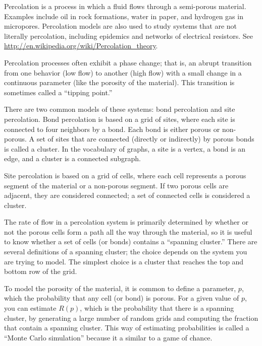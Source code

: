 \documentclass[10pt]{book}
\begin{document}
Percolation is a process in which a fluid flows through a semi-porous
material.  Examples include oil in rock formations, water in paper,
and hydrogen gas in micropores.  Percolation models are also used to
study systems that are not literally percolation, including epidemics
and networks of electrical resistors.  See
\url{http://en.wikipedia.org/wiki/Percolation_theory}.

Percolation processes often exhibit a phase change; that is, an
abrupt transition from one behavior (low flow) to another
(high flow) with a small change in a continuous parameter (like
the porosity of the material).  This transition is sometimes
called a ``tipping point.''

There are two common models of these systems: bond percolation
and site percolation.  Bond percolation is based on a grid
of sites, where each site is connected to four neighbors by
a bond.  Each bond is either porous or non-porous.  A set of sites
that are connected (directly or indirectly) by porous bonds is
called a cluster.  In the vocabulary of graphs, a site is a vertex,
a bond is an edge, and a cluster is a connected subgraph.

Site percolation is based on a grid of cells, where each cell
represents a porous segment of the material or a non-porous segment.
If two porous cells are adjacent, they are considered connected; a set
of connected cells is considered a cluster.

The rate of flow in a percolation system is primarily determined by
whether or not the porous cells form a path all the way through the
material, so it is useful to know whether a set of cells (or bonds)
contains a ``spanning cluster.''  There are several
definitions of a spanning cluster; the choice depends on the system
you are trying to model. The simplest choice is a cluster that reaches
the top and bottom row of the grid.

To model the porosity of the material, it is common to define
a parameter, $p$, which the probability that any cell (or bond)
is porous.  For a given value of $p$, you can estimate 
$R(p)$, which is the probability that there is a spanning cluster,
by generating a large number of random grids and computing the
fraction that contain a spanning cluster.  This way of estimating
probabilities is called a ``Monte Carlo simulation'' because
it a similar to a game of chance.
\end{document}
